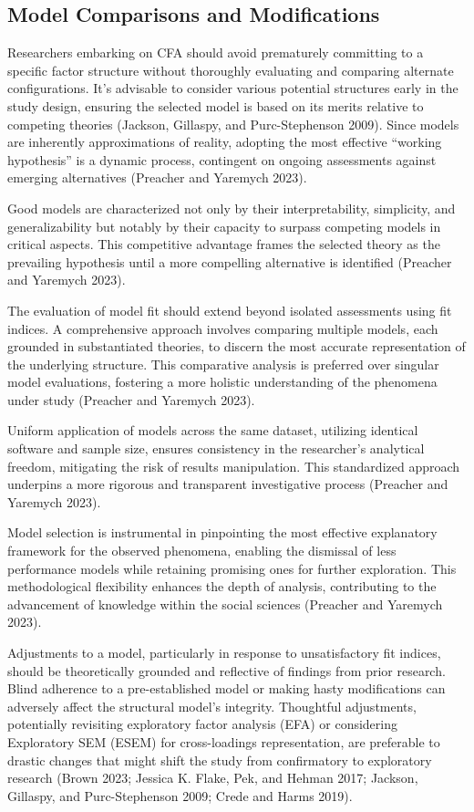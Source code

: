 \documentclass[
  a4paper,
]{article}
\begin{document}
\subsection{Model Comparisons and
Modifications}\label{model-comparisons-and-modifications}

Researchers embarking on CFA should avoid prematurely committing to a
specific factor structure without thoroughly evaluating and comparing
alternate configurations. It's advisable to consider various potential
structures early in the study design, ensuring the selected model is
based on its merits relative to competing theories (Jackson, Gillaspy,
and Purc-Stephenson 2009). Since models are inherently approximations of
reality, adopting the most effective ``working hypothesis'' is a dynamic
process, contingent on ongoing assessments against emerging alternatives
(Preacher and Yaremych 2023).

Good models are characterized not only by their interpretability,
simplicity, and generalizability but notably by their capacity to
surpass competing models in critical aspects. This competitive advantage
frames the selected theory as the prevailing hypothesis until a more
compelling alternative is identified (Preacher and Yaremych 2023).

The evaluation of model fit should extend beyond isolated assessments
using fit indices. A comprehensive approach involves comparing multiple
models, each grounded in substantiated theories, to discern the most
accurate representation of the underlying structure. This comparative
analysis is preferred over singular model evaluations, fostering a more
holistic understanding of the phenomena under study (Preacher and
Yaremych 2023).

Uniform application of models across the same dataset, utilizing
identical software and sample size, ensures consistency in the
researcher's analytical freedom, mitigating the risk of results
manipulation. This standardized approach underpins a more rigorous and
transparent investigative process (Preacher and Yaremych 2023).

Model selection is instrumental in pinpointing the most effective
explanatory framework for the observed phenomena, enabling the dismissal
of less performance models while retaining promising ones for further
exploration. This methodological flexibility enhances the depth of
analysis, contributing to the advancement of knowledge within the social
sciences (Preacher and Yaremych 2023).

Adjustments to a model, particularly in response to unsatisfactory fit
indices, should be theoretically grounded and reflective of findings
from prior research. Blind adherence to a pre-established model or
making hasty modifications can adversely affect the structural model's
integrity. Thoughtful adjustments, potentially revisiting exploratory
factor analysis (EFA) or considering Exploratory SEM (ESEM) for
cross-loadings representation, are preferable to drastic changes that
might shift the study from confirmatory to exploratory research (Brown
2023; Jessica K. Flake, Pek, and Hehman 2017; Jackson, Gillaspy, and
Purc-Stephenson 2009; Crede and Harms 2019).
\end{document}
